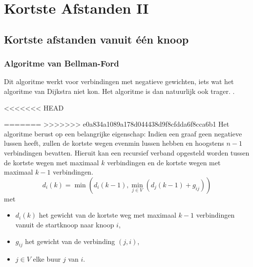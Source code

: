\documentclass{report}
\begin{document}
\chapter{Kortste Afstanden II}
\section{Kortste afstanden vanuit één knoop}
\subsection{Algoritme van Bellman-Ford}
Dit algoritme werkt voor verbindingen met negatieve gewichten, iets wat het algoritme van Dijkstra niet kon. Het algoritme is dan natuurlijk ook trager. .


<<<<<<< HEAD

=======
>>>>>>> e0a834a1089a178d044438d9f8cfdda6f8cca6b1
Het algoritme berust op een belangrijke eigenschap: Indien een graaf geen negatieve lussen heeft, zullen de kortste wegen evenmin lussen hebben en hoogstens $n - 1$ verbindingen bevatten. Hieruit kan een recursief verband opgesteld worden tussen de kortste wegen met maximaal $k$ verbindingen en de kortste wegen met maximaal $k - 1$ verbindingen.
$$d_i(k) = \min(d_i(k - 1), \min\limits_{j \in V} (d_j(k - 1) + g_{ij}))$$
met
\begin{itemize}
	\item $d_i(k)$ het gewicht van de kortste weg met maximaal $k - 1$ verbindingen vanuit de startknoop naar knoop $i$,
	\item $g_{ij}$ het gewicht van de verbinding $(j, i)$,
	\item $j \in V$ elke buur $j$ van $i$.
\end{itemize}
\end{document}
